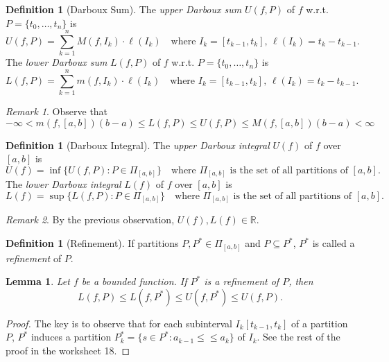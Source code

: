 \documentclass[12pt, lettersize]{book}
\theoremstyle{plain}
\newtheorem{lem}[thm]{Lemma}
\theoremstyle{definition}
\newtheorem{dfn}[thm]{Definition}
\theoremstyle{remark}
\newtheorem*{rem}{Remark}
\newcommand{\R}{\mathbb{R}}
\begin{document}
			\begin{dfn}[Darboux Sum]
			The \emph{upper Darboux sum} $U(f,P)$ of $f$ w.r.t. $P=\{t_0,\dots,t_n\}$ is
			\begin{displaymath}
				U(f,P)=\sum_{k=1}^{n}M(f,I_k)\cdot\ell(I_k)\quad\text{where $I_k=[t_{k-1},t_k]$,\ $\ell(I_k)=t_k-t_{k-1}$}.
			\end{displaymath}
			The \emph{lower Darboux sum} $L(f,P)$ of $f$ w.r.t. $P=\{t_0,\dots,t_n\}$ is
			\begin{displaymath}
				L(f,P)=\sum_{k=1}^{n}m(f,I_k)\cdot\ell(I_k)\quad\text{where $I_k=[t_{k-1},t_k]$,\ $\ell(I_k)=t_k-t_{k-1}$}.
			\end{displaymath}
			\end{dfn}
			\begin{rem}
			Observe that
			\begin{displaymath}
				-\infty<m(f,[a,b])(b-a)\leq L(f,P)\leq U(f,P)\leq M(f,[a,b])(b-a)<\infty
			\end{displaymath}
			\end{rem}
			
			\begin{dfn}[Darboux Integral]
			The \emph{upper Darboux integral} $U(f)$ of $f$ over $[a,b]$ is
			\begin{displaymath}
				U(f)=\inf\{U(f,P):P\in\Pi_{[a,b]}\}\quad\text{where $\Pi_{[a,b]}$ is the set of all partitions of $[a,b]$}.
			\end{displaymath}
			The \emph{lower Darboux integral} $L(f)$ of $f$ over $[a,b]$ is
			\begin{displaymath}
				L(f)=\sup\{L(f,P):P\in\Pi_{[a,b]}\}\quad\text{where $\Pi_{[a,b]}$ is the set of all partitions of $[a,b]$}.
			\end{displaymath}
			\end{dfn}
			\begin{rem}
			By the previous observation, $U(f),L(f)\in\R$. 
			\end{rem}
			
			\begin{dfn}[Refinement]
			If partitions $P,P^\ast\in\Pi_{[a,b]}$ and $P\subseteq P^\ast$, $P^\ast$ is called a \emph{refinement} of $P$.
			\end{dfn}
			
			\begin{lem}
			Let $f$ be a bounded function. If $P^\ast$ is a refinement of $P$, then
			\begin{displaymath}
				L(f,P)\leq L(f,P^\ast)\leq U(f,P^\ast)\leq U(f,P).
			\end{displaymath}
			\end{lem}
			\begin{proof}
			The key is to observe that for each subinterval $I_k[t_{k-1},t_k]$ of a partition $P$, $P^\ast$ induces a partition $P^\ast_k=\{s\in P^\ast: a_{k-1}\leq\leq a_k\}$ of $I_k$. See the rest of the proof in the worksheet 18.
			\end{proof}
			
\end{document}
